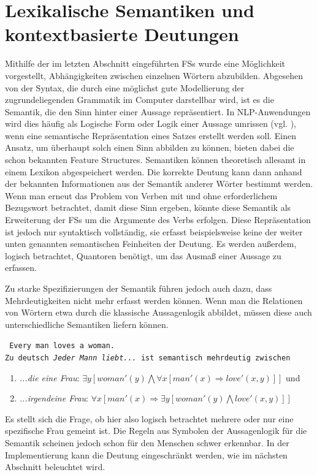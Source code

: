\documentclass[12pt]{report}
\begin{document}
\section{Lexikalische Semantiken und kontextbasierte Deutungen}
Mithilfe der im letzten Abschnitt eingeführten FSs wurde eine Möglichkeit vorgestellt, Abhängigkeiten zwischen einzelnen Wörtern abzubilden. Abgesehen von der Syntax, die durch eine möglichst gute Modellierung der zugrundeliegenden Grammatik im Computer darstellbar wird, ist es die Semantik, die den \glqq  Sinn\grqq{} hinter einer Aussage repräsentiert. In NLP-Anwendungen wird dies häufig als \glqq  Logische Form\grqq{} oder \glqq  Logik einer Aussage\grqq{} umrissen (vgl. \cite{swb02}), wenn eine semantische Repräsentation eines Satzes erstellt werden soll. Einen Ansatz, um überhaupt solch einen Sinn abbilden zu können, bieten dabei die schon bekannten Feature Structures. Semantiken können theoretisch allesamt in einem Lexikon abgespeichert werden. Die korrekte Deutung kann dann anhand der bekannten Informationen aus der Semantik anderer Wörter bestimmt werden. Wenn man erneut das Problem von Verben mit und ohne erforderlichem Bezugswort betrachtet, damit diese Sinn ergeben, könnte diese Semantik als Erweiterung der FSs um die Argumente des Verbs erfolgen. Diese Repräsentation ist jedoch nur syntaktisch vollständig, sie erfasst beispielsweise keine der weiter unten genannten semantischen Feinheiten der Deutung. Es werden außerdem, logisch betrachtet, Quantoren benötigt, um das Ausmaß einer Aussage zu erfassen.

Zu starke Spezifizierungen der Semantik führen jedoch auch dazu, dass Mehrdeutigkeiten nicht mehr erfasst werden können. Wenn man die Relationen von Wörtern etwa durch die klassische Aussagenlogik abbildet, müssen diese auch unterschiedliche Semantiken liefern können.

\tt
Every man loves a woman.
\rm
\\
Zu deutsch \textit{\glqq  Jeder Mann liebt...\grqq{}} ist semantisch mehrdeutig zwischen  
\begin{enumerate}
\item \textit{\glqq  ...die eine Frau\grqq{}}: $\exists y [woman'(y) \bigwedge \forall x [man'(x) \Rightarrow love'(x,y)]]$ und
\item \textit{\glqq  ...irgendeine Frau\grqq{}}: $\forall x [man'(x) \Rightarrow \exists y [woman'(y) \bigwedge love'(x,y)]]$
\end{enumerate}


Es stellt sich die Frage, ob hier also logisch betrachtet mehrere oder nur eine spezifische Frau gemeint ist. Die Regeln aus Symbolen der Aussagenlogik für die Semantik scheinen jedoch schon für den Menschen schwer erkennbar. In der Implementierung kann die Deutung eingeschränkt werden, wie im nächsten Abschnitt beleuchtet wird.
\end{document}

